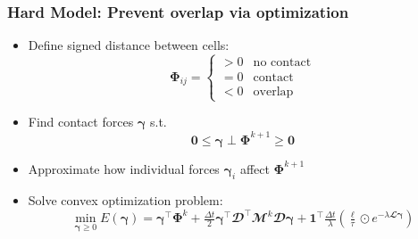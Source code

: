 \documentclass[10pt,t]{beamer}
\begin{document}
\begin{frame}
    \frametitle{Hard Model: Prevent overlap via optimization}

    \begin{itemize}
        \item Define signed distance between cells:
              \[
                  \boldsymbol{\Phi}_{ij} =
                  \begin{cases}
                      > 0 & \text{no contact} \\
                      = 0 & \text{contact}    \\
                      < 0 & \text{overlap}
                  \end{cases}
              \]

        \item Find contact forces $\boldsymbol{\gamma}$ s.t.
              \[
                  \boldsymbol{0} \le \boldsymbol{\gamma} \perp \boldsymbol{\Phi}^{k+1} \ge \boldsymbol{0}
              \]

        \item Approximate how individual forces $\boldsymbol{\gamma}_{i}$ affect $\boldsymbol{\Phi}^{k+1}$
        \item Solve convex optimization problem:
              \[
                  \min_{\boldsymbol{\gamma} \ge 0} E(\boldsymbol{\gamma})
                  = \boldsymbol{\gamma}^\top \boldsymbol{\Phi}^k
                  + \tfrac{\Delta t}{2}\boldsymbol{\gamma}^\top
                  \mathbfcal{D}^\top \mathbfcal{M}^k \mathbfcal{D}\boldsymbol{\gamma}
                  + \mathbf{1}^\top \tfrac{\Delta t}{\lambda}
                  \left( \tfrac{\boldsymbol{\ell}}{\tau} \odot
                  e^{-\lambda \mathbfcal{L} \boldsymbol{\gamma}} \right)
              \]

    \end{itemize}

\end{frame}
\end{document}
